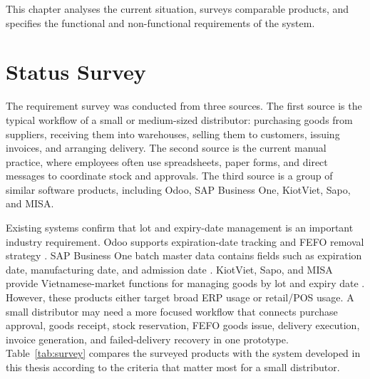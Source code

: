 This chapter analyses the current situation, surveys comparable products, and
specifies the functional and non-functional requirements of the system.

\section{Status Survey}
The requirement survey was conducted from three sources. The first source is the
typical workflow of a small or medium-sized distributor: purchasing goods from
suppliers, receiving them into warehouses, selling them to customers, issuing
invoices, and arranging delivery. The second source is the current manual
practice, where employees often use spreadsheets, paper forms, and direct
messages to coordinate stock and approvals. The third source is a group of
similar software products, including Odoo, SAP Business One, KiotViet, Sapo, and
MISA.

Existing systems confirm that lot and expiry-date management is an important
industry requirement. Odoo supports expiration-date tracking and FEFO removal
strategy \cite{odooExpiration,odooFefo}. SAP Business One batch master data
contains fields such as expiration date, manufacturing date, and admission date
\cite{sapBatch}. KiotViet, Sapo, and MISA provide Vietnamese-market functions
for managing goods by lot and expiry date
\cite{kiotvietLotExpiry,sapoLotExpiry,misaLotExpiry}. However, these products
either target broad ERP usage or retail/POS usage. A small distributor may need a
more focused workflow that connects purchase approval, goods receipt, stock
reservation, FEFO goods issue, delivery execution, invoice generation, and
failed-delivery recovery in one prototype. Table~\ref{tab:survey} compares the
surveyed products with the system developed in this thesis according to the
criteria that matter most for a small distributor.

